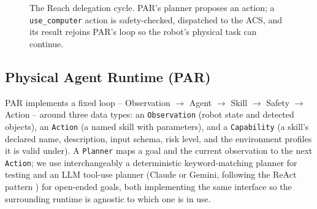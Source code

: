 \documentclass[conference]{IEEEtran}
\begin{document}
\begin{figure}[t]
\centering
{}
\caption{The Reach delegation cycle. PAR's planner proposes an action; a \texttt{use\_computer} action is safety-checked, dispatched to the ACS, and its result rejoins PAR's loop so the robot's physical task can continue.}
\label{fig:cycle}
\end{figure}

\subsection{Physical Agent Runtime (PAR)}
PAR implements a fixed loop -- Observation $\rightarrow$ Agent $\rightarrow$ Skill $\rightarrow$ Safety $\rightarrow$ Action -- around three data
types: an \texttt{Observation} (robot state and detected objects), an \texttt{Action} (a named skill with parameters),
and a \texttt{Capability} (a skill's declared name, description, input schema, risk level, and the environment
profiles it is valid under). A \texttt{Planner} maps a goal and the current observation to the next \texttt{Action}; we use
interchangeably a deterministic keyword-matching planner for testing and an LLM tool-use planner (Claude
or Gemini, following the ReAct pattern \cite{yao2023react}) for open-ended goals, both implementing the same interface so
the surrounding runtime is agnostic to which one is in use.
\end{document}
